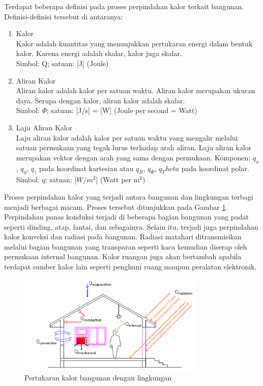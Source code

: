 Terdapat beberapa definisi pada proses perpindahan kalor terkait bangunan. Definisi-definisi tersebut di antaranya: \cite{BuildingPhysics}

\begin{enumerate}
	\item Kalor \\
	Kalor adalah kuantitas yang menunjukkan pertukaran energi dalam bentuk kalor. Karena energi adalah skalar, kalor juga skalar.\\
	Simbol: Q; satuan: [J] (Joule)
	\item Aliran Kalor \\
	Aliran kalor adalah kalor per satuan waktu. Aliran kalor merupakan ukuran daya. Serupa dengan kalor, aliran kalor adalah skalar.\\
	Simbol: $\Phi$; satuan: [J/s] = [W] (Joule per second = Watt)
	\item Laju Aliran Kalor \\
	Laju aliran kalor adalah kalor per satuan waktu yang mengalir melalui satuan permukaan yang tegak lurus terhadap arah aliran. Laju aliran kalor merupakan vektor dengan arah yang sama dengan permukaan. Komponen: $q_x$, $q_y$, $q_z$ pada koordinat kartesian atau $q_R$, $q_\Phi$, $q_Theta$ pada koordinat polar.\\
	Simbol: $q$; satuan: [$W/m^2$] (Watt per m$^2$)
\end{enumerate}

Proses perpindahan kalor yang terjadi antara bangunan dan lingkungan terbagi menjadi berbagai macam. Proses tersebut ditunjukkan pada Gambar \ref{fig:3:HeatTransferProcess}. Perpindahan panas konduksi terjadi di beberapa bagian bangunan yang padat seperti dinding, atap, lantai, dan sebagainya. Selain itu, terjadi juga perpindahan kalor konveksi dan radiasi pada bangunan. Radiasi matahari ditransmisikan melalui bagian bangunan yang transparan seperti kaca kemudian diserap oleh permukaan internal bangunan. Kalor ruangan juga akan bertambah apabila terdapat sumber kalor lain seperti penghuni ruang maupun peralatan elektronik. \cite{skripsiIchfan}

\begin{figure}[!h]
	\centering
	\includegraphics[width=0.8\textwidth]{figures/HeatTransferProcess}
	\caption{Pertukaran kalor bangunan dengan lingkungan \cite{skripsiIchfan}}
	\label{fig:3:HeatTransferProcess}
\end{figure}

